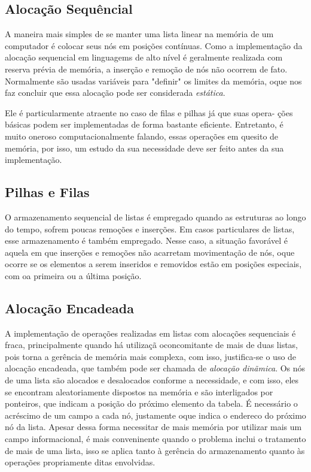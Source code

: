 \documentclass[12pt, a4paper]{paper}
\begin{document}
  \subsection{Alocação Sequêncial} %
  \label{sub:Alocação Sequêncial}
  A maneira mais simples de se manter uma lista linear na memória de um computador é colocar seus nós em posições contínuas. Como a implementação da alocação sequencial em linguagems de alto nível é geralmente realizada com reserva prévia de memória, a inserção e remoção de nós não ocorrem de fato. Normalmente são usadas variáveis para "definir" os limites da memória, oque nos faz concluir que essa alocação pode ser considerada \textit{estática}.\par
  Ele é particularmente atraente no caso de filas e pilhas já que suas opera-
  ções básicas podem ser implementadas de forma bastante eficiente. Entretanto, é muito oneroso computacionalmente falando, essas operações em quesito de memória, por isso, um estudo da sua necessidade deve ser feito antes da sua implementação.
  \subsection{Pilhas e Filas} %
  \label{sub:Pilhas e Filas}
  O armazenamento sequencial de listas é empregado quando as estruturas ao longo do tempo, sofrem poucas remoções e inserções. Em casos particulares de listas, esse armazenamento é também empregado. Nesse caso, a situação favorável é aquela em que inserções e remoções não acarretam movimentação de nós, oque ocorre se os elementos a serem inseridos e removidos estão em posições especiais, com oa primeira ou a última posição.
  \subsection{Alocação Encadeada} %
  \label{sub:Alocação Encadeada}
  A implementação de operações realizadas em listas com alocações sequenciais  é fraca, principalmente quando há utilizaçã oconcomitante de mais de duas listas, pois torna a gerência de memória mais complexa, com isso, justifica-se o uso de alocação encadeada, que também pode ser chamada de \textit{alocação dinãmica}. Os nós de uma lista são alocados e desalocados conforme a necessidade, e com isso, eles se encontram aleatoriamente dispostos na memória e são interligados por ponteiros, que indicam a posição do próximo elemento da tabela. É necessário o acréscimo de um campo a cada nó, justamente oque indica o endereco do próximo nó da lista. Apesar dessa forma necessitar de mais memória por utilizar mais um campo informacional, é mais conveninente quando o problema inclui o tratamento de mais de uma lista, isso se aplica tanto à gerência do armazenamento quanto às operações propriamente ditas envolvidas.
\end{document}
